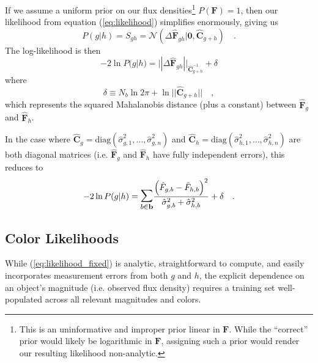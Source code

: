 \documentclass[a4paper,fleqn,usenatbib,english]{mnras}
\begin{document}
If we assume a uniform prior on our flux densities\footnote{This is an uninformative and improper prior linear in $\mathbf{F}$. While the ``correct'' prior would likely be logarithmic in $\mathbf{F}$, assigning such a prior would render our resulting likelihood non-analytic.} $P(\mathbf{F})=1$, then our likelihood from equation (\ref{eq:likelihood}) simplifies enormously, giving us
\begin{equation}\label{eq:likelihood_fixed}
P(g|h) = S_{gh} = \mathcal{N}(\Delta\mathbf{\hat{F}}_{gh}|\mathbf{0},\mathbf{\hat{C}}_{g+h}) \quad .
\end{equation}
The log-likelihood is then
\begin{equation}
\boxed{
-2\ln P(g|h) = ||\Delta\mathbf{\hat{F}}_{gh}||_{\mathbf{\hat{C}}_{g+h}^{-1}} + \delta 
}
\end{equation}
where
\begin{equation}
\delta \equiv N_b\ln 2\pi + \ln||\mathbf{\hat{C}}_{g+h}|| \quad ,
\end{equation}
which represents the squared Mahalanobis distance (plus a constant) between $\mathbf{\hat{F}}_g$ and $\mathbf{\hat{F}}_h$.

In the case where $\mathbf{\hat{C}}_g=\mathrm{diag}(\hat{\sigma}^2_{g,1},\ldots,\hat{\sigma}^2_{g,n})$ and $\mathbf{\hat{C}}_h=\mathrm{diag}(\hat{\sigma}^2_{h,1},\ldots,\hat{\sigma}^2_{h,n})$ are both diagonal matrices (i.e. $\mathbf{\hat{F}}_g$ and $\mathbf{\hat{F}}_h$ have fully independent errors), this reduces to
\begin{equation}
-2\ln P(g|h) = \mathlarger{\mathlarger{\sum}}_{b\in\mathbf{b}} \frac{\left(\hat{F}_{g,b}-\hat{F}_{h,b}\right)^2}{\hat{\sigma}_{g,b}^2+\hat{\sigma}_{h,b}^2} + \delta \quad .
\end{equation}

\subsection{Color Likelihoods}
\label{subsec:like_color}

While (\ref{eq:likelihood_fixed}) is analytic, straightforward to compute, and easily incorporates measurement errors from both $g$ and $h$, the explicit dependence on an object's magnitude (i.e. observed flux density) requires a training set well-populated across all relevant magnitudes and colors. 
\end{document}
